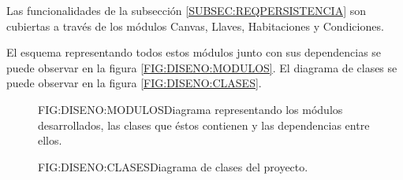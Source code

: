 Las funcionalidades de la subsección \ref{SUBSEC:REQPERSISTENCIA} son cubiertas a través de los módulos Canvas, Llaves, Habitaciones y Condiciones.

El esquema representando todos estos módulos junto con sus dependencias se puede observar en la figura \ref{FIG:DISENO:MODULOS}.
El diagrama de clases se puede observar en la figura \ref{FIG:DISENO:CLASES}.

\begin{figure}{FIG:DISENO:MODULOS}{Diagrama representando los módulos desarrollados, las clases que éstos contienen y las dependencias entre ellos.}
\end{figure}

\begin{figure}{FIG:DISENO:CLASES}{Diagrama de clases del proyecto.}
\end{figure}